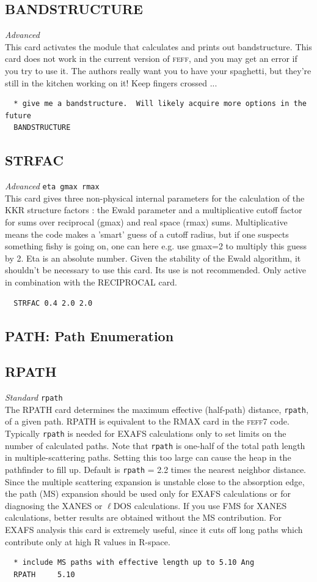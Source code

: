 \documentclass[11pt,oneside]{report} %
\newcommand{\program}[1]{\textsc{#1}}
\newcommand{\feff}{\program{feff}}
\newenvironment{Card}[4]%
      {\vspace{3ex}%
        \subsection{#1}
        \quad\textsl{#3}\newline
        \quad\texttt{#2}\newline%
        \label{card:#4}\\}
      {}
\begin{document}
\begin{Card}{BANDSTRUCTURE}{}{Advanced}{ban}
  This card activates the module that calculates and prints out bandstructure.  This card does not work in the current version of {\feff}, and you may get an error if you try to use it.  The authors really want you to have your spaghetti, but they're still in the kitchen
  working on it!  Keep fingers crossed ...
\begin{verbatim}
  * give me a bandstructure.  Will likely acquire more options in the future
  BANDSTRUCTURE
\end{verbatim}
\end{Card}



\begin{Card}{STRFAC}{eta gmax rmax}{Advanced}{str}
  This card gives three non-physical internal parameters for the calculation of the KKR structure factors : the Ewald parameter and a multiplicative cutoff factor for
  sums over reciprocal (gmax) and real space (rmax) sums.  Multiplicative means the code makes a 'smart' guess of a cutoff radius, but if one suspects something fishy
  is going on, one can here e.g. use gmax=2 to multiply this guess by 2.  Eta is an absolute number.
  Given the stability of the Ewald algorithm, it shouldn't be necessary to use this card.  Its use is not recommended.
  Only active in combination with the RECIPROCAL card.
\begin{verbatim}
  STRFAC 0.4 2.0 2.0
\end{verbatim}
\end{Card}



\subsection{PATH: Path Enumeration}
\label{sec:Path-enum-modul}


\begin{Card}{RPATH}{rpath}{Standard}{rpa}
  The RPATH card determines the maximum effective (half-path)
  distance, \texttt{rpath}, of a given path. RPATH is equivalent to
  the RMAX card in the {\feff}7 code.
  Typically \texttt{rpath} is needed for EXAFS calculations only to
  set limits on the number of calculated paths. Note that
  \texttt{rpath} is one-half of the total path length in
  multiple-scattering paths. Setting this too large can cause the
  heap in the pathfinder to fill up. Default is \texttt{rpath} = 2.2
  times the nearest neighbor distance. Since the multiple scattering
  expansion is unstable close to the absorption edge, the path (MS)
  expansion should be used only for EXAFS calculations or for
  diagnosing the XANES or $\ell$DOS calculations. If you use FMS for XANES
  calculations, better results are obtained without the MS
  contribution. For EXAFS analysis this card is extremely useful,
  since it cuts off long paths which contribute only at high
  R values in R-space.
\begin{verbatim}
  * include MS paths with effective length up to 5.10 Ang
  RPATH     5.10
\end{verbatim}
\end{Card}
\end{document}
